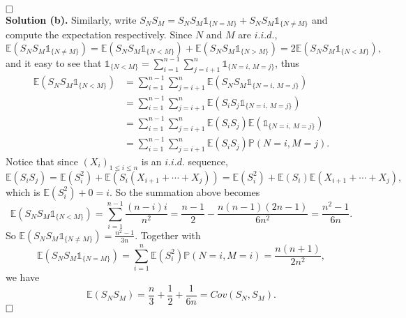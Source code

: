 \documentclass[12pt]{article}
\begin{document}
\begin{itemize}
$\hspace{\fill}\square$\\
\textbf{Solution (b).} Similarly, write $S_NS_M=S_NS_M\mathds{1}_{\{N=M\}}+S_NS_M\mathds{1}_{\{N\neq M\}}$ and compute the expectation respectively. Since $N$ and $M$ are $i.i.d.$,
\begin{equation*}
\mathbb{E}(S_NS_M\mathds{1}_{\{N\neq M\}})=\mathbb{E}(S_NS_M\mathds{1}_{\{N < M\}})+\mathbb{E}(S_NS_M\mathds{1}_{\{N > M\}})=2\mathbb{E}(S_NS_M\mathds{1}_{\{N<M\}}),
\end{equation*}
and it easy to see that $\mathds{1}_{\{N<M\}}=\sum_{i=1}^{n-1}\sum_{j=i+1}^n\mathds{1}_{\{N=i,\,M=j\}}$, thus
\begin{equation*}
\begin{aligned}
\mathbb{E}(S_NS_M\mathds{1}_{\{N<M\}}) &= \sum_{i=1}^{n-1}\sum_{j=i+1}^n\mathbb{E}(S_NS_M\mathds{1}_{\{N=i,\,M=j\}}) \\&
=\sum_{i=1}^{n-1}\sum_{j=i+1}^n\mathbb{E}(S_iS_j\mathds{1}_{\{N=i,\,M=j\}}) \\&
=\sum_{i=1}^{n-1}\sum_{j=i+1}^n\mathbb{E}(S_iS_j)\mathbb{E}(\mathds{1}_{\{N=i,\,M=j\}}) \\&
=\sum_{i=1}^{n-1}\sum_{j=i+1}^n\mathbb{E}(S_iS_j)\mathbb{P}(N=i,M=j).
\end{aligned}
\end{equation*}
Notice that since $(X_i)_{1\leq i\leq n}$ is an $i.i.d.$ sequence,
\begin{equation*}
\mathbb{E}(S_iS_j)=\mathbb{E}(S_i^2)+\mathbb{E}(S_i(X_{i+1}+\cdots +X_j))=\mathbb{E}(S_i^2)+\mathbb{E}(S_i)\mathbb{E}(X_{i+1}+\cdots +X_j),
\end{equation*}
which is $\mathbb{E}(S_i^2)+0=i$. So the summation above becomes
\begin{equation*}
\mathbb{E}(S_NS_M\mathds{1}_{\{N<M\}})=\sum_{i=1}^{n-1}\frac{(n-i)i}{n^2}=\frac{n-1}{2}-\frac{n(n-1)(2n-1)}{6n^2}=\frac{n^2-1}{6n}.
\end{equation*}
So $\mathbb{E}(S_NS_M\mathds{1}_{\{N\neq M\}})=\frac{n^2-1}{3n}$. Together with
\begin{equation*}
\mathbb{E}(S_NS_M\mathds{1}_{\{N=M\}})=\sum_{i=1}^n\mathbb{E}(S_i^2)\mathbb{P}(N=i,M=i)=\frac{n(n+1)}{2n^2},
\end{equation*}
we have
\begin{equation*}
\mathbb{E}(S_NS_M)=\frac{n}{3} + \frac{1}{2}+\frac{1}{6n}=Cov(S_N,S_M).
\end{equation*}
$\hspace{\fill}\square$
\end{itemize}
\end{document}
